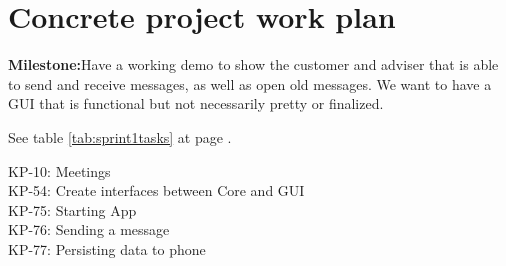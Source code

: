 \section{Concrete project work plan}

\textbf{Milestone:}Have a working demo to show the customer and adviser that is able to send and receive messages, as well as open old messages. We want to have a GUI that is functional but not necessarily pretty or finalized.

See table \ref{tab:sprint1tasks} at page \pageref{tab:sprint1tasks}.
\begin{table}
KP-10: Meetings \\ 
KP-54: Create interfaces between Core and GUI \\
KP-75: Starting App \\
KP-76: Sending a message\\
KP-77: Persisting data to phone\\


\end{table}
